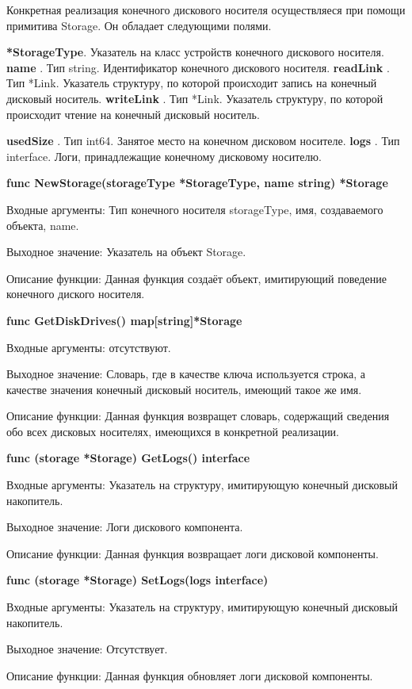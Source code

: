 Конкретная реализация конечного дискового носителя осуществляеся при помощи примитива Storage. Он обладает следующими полями. 

\textbf{	*StorageType}. Указатель на класс устройств конечного дискового носителя. 
\textbf{	name     }. Тип string. Идентификатор конечного дискового носителя.
\textbf{	readLink }. Тип *Link. Указатель структуру, по которой происходит запись на  конечный дисковый носитель.
\textbf{	writeLink }. Тип *Link. Указатель структуру, по которой происходит чтение на  конечный дисковый носитель.

\textbf{	usedSize }. Тип int64. Занятое место на конечном дисковом носителе.
\textbf{	logs }. Тип interface{}. Логи, принадлежащие конечному дисковому носителю.


\textbf{func NewStorage(storageType *StorageType, name string) *Storage}

Входные аргументы: Тип конечного носителя storageType, имя, создаваемого объекта, name. 

Выходное значение: Указатель на объект Storage. 

Описание функции: Данная функция создаёт объект, имитирующий поведение конечного диского носителя.

\textbf{func GetDiskDrives() map[string]*Storage}

Входные аргументы: отсутствуют.

Выходное значение: Словарь, где в качестве ключа используется строка, а качестве значения конечный дисковый носитель, имеющий такое же имя.

Описание функции: Данная функция возвращет словарь, содержащий сведения обо всех дисковых носителях, имеющихся в конкретной реализации. 

\textbf{func (storage *Storage) GetLogs() interface{}}

Входные аргументы: Указатель на структуру, имитирующую конечный дисковый накопитель.

Выходное значение: Логи дискового компонента. 

Описание функции: Данная функция возвращает логи дисковой компоненты. 

\textbf{func (storage *Storage) SetLogs(logs interface{})}

Входные аргументы: Указатель на структуру, имитирующую конечный дисковый накопитель.

Выходное значение:  Отсутствует.

Описание функции: Данная функция обновляет логи дисковой компоненты. 

